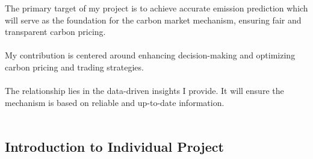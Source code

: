 \documentclass[light]{lutbeamer} %
\begin{document}
\begin{frame}
{        The primary target of my project is to achieve accurate emission prediction which will serve as the foundation for the carbon market mechanism, ensuring fair and transparent carbon pricing. \\~\\

        My contribution is centered around enhancing decision-making and optimizing carbon pricing and trading strategies.  \\~\\

        The relationship lies in the data-driven insights I provide. It will ensure the mechanism is based on reliable and up-to-date information.\\~\\
    }
\end{frame}
\subsection{Introduction to Individual Project}
\end{document}
